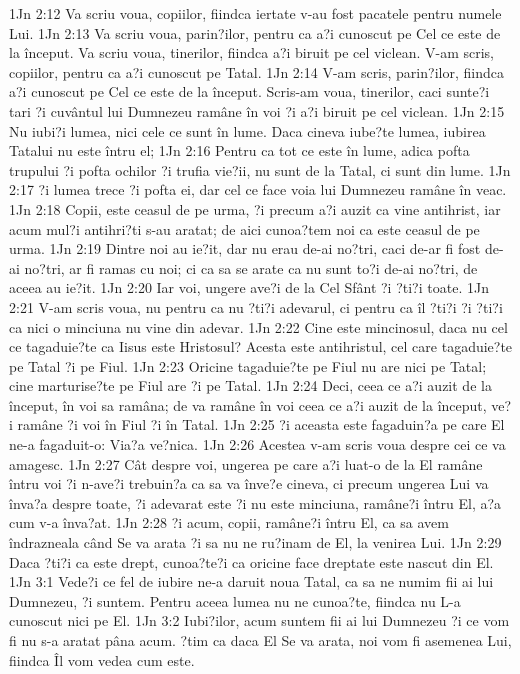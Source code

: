1Jn 2:12  Va scriu voua, copiilor, fiindca iertate v-au fost pacatele pentru numele Lui.
1Jn 2:13  Va scriu voua, parin?ilor, pentru ca a?i cunoscut pe Cel ce este de la început. Va scriu voua, tinerilor, fiindca a?i biruit pe cel viclean. V-am scris, copiilor, pentru ca a?i cunoscut pe Tatal.
1Jn 2:14  V-am scris, parin?ilor, fiindca a?i cunoscut pe Cel ce este de la început. Scris-am voua, tinerilor, caci sunte?i tari ?i cuvântul lui Dumnezeu ramâne în voi ?i a?i biruit pe cel viclean.
1Jn 2:15  Nu iubi?i lumea, nici cele ce sunt în lume. Daca cineva iube?te lumea, iubirea Tatalui nu este întru el;
1Jn 2:16  Pentru ca tot ce este în lume, adica pofta trupului ?i pofta ochilor ?i trufia vie?ii, nu sunt de la Tatal, ci sunt din lume.
1Jn 2:17  ?i lumea trece ?i pofta ei, dar cel ce face voia lui Dumnezeu ramâne în veac.
1Jn 2:18  Copii, este ceasul de pe urma, ?i precum a?i auzit ca vine antihrist, iar acum mul?i antihri?ti s-au aratat; de aici cunoa?tem noi ca este ceasul de pe urma.
1Jn 2:19  Dintre noi au ie?it, dar nu erau de-ai no?tri, caci de-ar fi fost de-ai no?tri, ar fi ramas cu noi; ci ca sa se arate ca nu sunt to?i de-ai no?tri, de aceea au ie?it.
1Jn 2:20  Iar voi, ungere ave?i de la Cel Sfânt ?i ?ti?i toate.
1Jn 2:21  V-am scris voua, nu pentru ca nu ?ti?i adevarul, ci pentru ca îl ?ti?i ?i ?ti?i ca nici o minciuna nu vine din adevar.
1Jn 2:22  Cine este mincinosul, daca nu cel ce tagaduie?te ca Iisus este Hristosul? Acesta este antihristul, cel care tagaduie?te pe Tatal ?i pe Fiul.
1Jn 2:23  Oricine tagaduie?te pe Fiul nu are nici pe Tatal; cine marturise?te pe Fiul are ?i pe Tatal.
1Jn 2:24  Deci, ceea ce a?i auzit de la început, în voi sa ramâna; de va ramâne în voi ceea ce a?i auzit de la început, ve?i ramâne ?i voi în Fiul ?i în Tatal.
1Jn 2:25  ?i aceasta este fagaduin?a pe care El ne-a fagaduit-o: Via?a ve?nica.
1Jn 2:26  Acestea v-am scris voua despre cei ce va amagesc.
1Jn 2:27  Cât despre voi, ungerea pe care a?i luat-o de la El ramâne întru voi ?i n-ave?i trebuin?a ca sa va înve?e cineva, ci precum ungerea Lui va înva?a despre toate, ?i adevarat este ?i nu este minciuna, ramâne?i întru El, a?a cum v-a înva?at.
1Jn 2:28  ?i acum, copii, ramâne?i întru El, ca sa avem îndrazneala când Se va arata ?i sa nu ne ru?inam de El, la venirea Lui.
1Jn 2:29  Daca ?ti?i ca este drept, cunoa?te?i ca oricine face dreptate este nascut din El.
1Jn 3:1  Vede?i ce fel de iubire ne-a daruit noua Tatal, ca sa ne numim fii ai lui Dumnezeu, ?i suntem. Pentru aceea lumea nu ne cunoa?te, fiindca nu L-a cunoscut nici pe El.
1Jn 3:2  Iubi?ilor, acum suntem fii ai lui Dumnezeu ?i ce vom fi nu s-a aratat pâna acum. ?tim ca daca El Se va arata, noi vom fi asemenea Lui, fiindca Îl vom vedea cum este.
